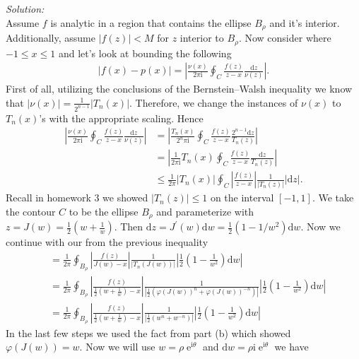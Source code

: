 \documentclass[10pt]{amsart}
\newcommand{\D}{\mathrm{d}}
\newcommand{\I}{\mathrm{i}}
\DeclareMathOperator{\E}{e}
\theoremstyle{nonumberplain}
\begin{document}
\begin{enumerate}[label={\bf {\arabic*}:}]
\begin{enumerate}
\noindent
\textit{Solution:} \\
Assume $f$ is analytic in a region that contains the ellipse $B_\rho$ and it's interior.
Additionally, assume $|f(z)| < M$ for $z$ interior to $B_\rho$.
Now consider where $-1 \leq x \leq 1$ and let's look at bounding the following
\begin{align*}
|f(x) - p(x)| = \left| \frac{\nu(x)}{2 \pi \I} \oint_C \frac{f(z)}{z - x}
	\frac{\D z}{\nu(z)} \right|.
\end{align*}
First of all, utilizing the conclusions of the Bernstein–Walsh inequality we know that $|\nu(x)| = \frac 1 {2^{n - 1}} |T_n(x)|$.
Therefore, we change the instances of $\nu(x)$ to $T_n(x)$'s with the appropriate scaling.
Hence
\begin{align*}
\left| \frac{\nu(x)}{2 \pi \I} \oint_C \frac{f(z)}{z - x} \frac{\D z}{\nu(z)} \right|
	&= \left| \frac{T_n(x)}{2^n \pi \I} \oint_C \frac{f(z)}{z - x} \frac{2^{n - 1}\D z}{T_n(z)} \right| \\
	&= \left| \frac 1 {2 \pi \I} T_n(x) \oint_C \frac{ f(z)}{z - x} \frac{\D z}{T_n(z)} \right| \\
	&\leq \frac 1 {2 \pi } |T_n(x)| \oint_C \left| \frac{ f(z)}{z - x} \right| \frac 1 {|T_n(z)|} |\D z|.
\end{align*}
Recall in homework 3 we showed $|T_n(z)| \leq 1$ on the interval $[-1, 1]$.
We take the contour $C$ to be the ellipse $B_\rho$ and parameterize with $z = J(w) = \frac 1 2 (w + \frac 1 w)$.
Then $\D z = J^\prime(w) \D w = \frac 1 2 (1 - 1/w^2) \D w$.
Now we continue with our from the previous inequality
\begin{align*}
&= \frac 1 {2 \pi }
	\oint_{B_\rho}
		\left| \frac{ f(z)}{J(w) - x} \right|
		\frac 1 {|T_n(J(w))|}
		\left|\frac 1 2 \left(1 - \frac 1 {w^2} \right) \D w \right| \\
&= \frac 1 {2 \pi}
	\oint_{B_\rho}
		\left| \frac{ f(z)}{\frac 1 2 (w + \frac 1 w) - x} \right|
		\frac 1  {\left| \frac 1 2 \left( \varphi(J(w))^n + \varphi(J(w))^{-n} \right) \right|}
		\left|\frac 1 2 \left(1 - \frac 1 {w^2} \right) \D w \right| \\
&= \frac 1 {2 \pi}
	\oint_{B_\rho}
		\left| \frac{ f(z)}{\frac 1 2 (w + \frac 1 w) - x} \right|
		\frac 1  {\left| \frac 1 2 \left( w^n + w^{-n} \right) \right|}
		\left|\frac 1 2 \left(1 - \frac 1 {w^2} \right) \D w \right|
\end{align*}
In the last few steps we used the fact from part (b) which showed $\varphi(J(w)) = w$.
Now we will use $w = \rho \E^{\I \theta}$ and $\D w = \rho \I \E^{\I \theta}$ we have

\end{enumerate}
\end{enumerate}
\end{document}
